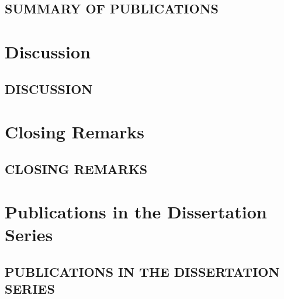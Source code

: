 \documentclass[english]{his-thesis}
\begin{document}
\chapter{SUMMARY OF PUBLICATIONS}
\label{ch:publications}
\lipsum[1]




\part*{Discussion}
\label{part:discussion}

\chapter{DISCUSSION}
\label{ch:discussion}
\lipsum[1]




\part*{Closing Remarks}
\label{part:closing-remarks}

\chapter{CLOSING REMARKS}
\label{ch:conclusions}
\lipsum[1]




\setlength{}
\listofreferences




\begin{fullarticles}

\end{fullarticles}



\part*{Publications in the Dissertation Series}
\chapter*{PUBLICATIONS IN THE DISSERTATION SERIES}

\end{document}
